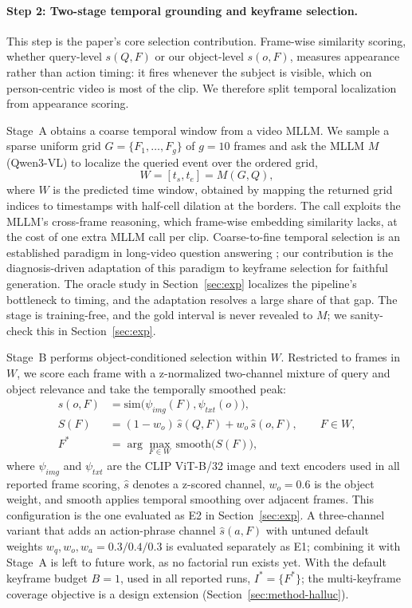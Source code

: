 \paragraph{Step 2: Two-stage temporal grounding and keyframe selection.} This step is the paper's core selection contribution. Frame-wise similarity scoring, whether query-level $s(Q,F)$ \citep{aks2502} or our object-level $s(o,F)$, measures appearance rather than action timing: it fires whenever the subject is visible, which on person-centric video is most of the clip. We therefore split temporal localization from appearance scoring.

Stage~A obtains a coarse temporal window from a video MLLM. We sample a sparse uniform grid $G = \{F_1, \ldots, F_g\}$ of $g = 10$ frames and ask the MLLM $M$ (Qwen3-VL) to localize the queried event over the ordered grid,
\begin{equation}
W = [t_s, t_e] = M(G, Q),
\end{equation}
where $W$ is the predicted time window, obtained by mapping the returned grid indices to timestamps with half-cell dilation at the borders. The call exploits the MLLM's cross-frame reasoning, which frame-wise embedding similarity lacks, at the cost of one extra MLLM call per clip. Coarse-to-fine temporal selection is an established paradigm in long-video question answering \citep{unitime2506,focus2510,himu2603,leadqa2507}; our contribution is the diagnosis-driven adaptation of this paradigm to keyframe selection for faithful generation. The oracle study in Section~\ref{sec:exp} localizes the pipeline's bottleneck to timing, and the adaptation resolves a large share of that gap. The stage is training-free, and the gold interval is never revealed to $M$; we sanity-check this in Section~\ref{sec:exp}.

Stage~B performs object-conditioned selection within $W$. Restricted to frames in $W$, we score each frame with a z-normalized two-channel mixture of query and object relevance and take the temporally smoothed peak:
\begin{align}
s(o, F) &= \mathrm{sim}\big(\psi_{img}(F), \psi_{txt}(o)\big), \\
S(F) &= (1-w_o)\,\hat{s}(Q,F) + w_o\,\hat{s}(o,F), \qquad F \in W, \\
F^* &= \arg\max_{F \in W}\, \mathrm{smooth}\big(S(F)\big),
\end{align}
where $\psi_{img}$ and $\psi_{txt}$ are the CLIP ViT-B/32 image and text encoders used in all reported frame scoring, $\hat{s}$ denotes a z-scored channel, $w_o = 0.6$ is the object weight, and $\mathrm{smooth}$ applies temporal smoothing over adjacent frames. This configuration is the one evaluated as E2 in Section~\ref{sec:exp}. A three-channel variant that adds an action-phrase channel $\hat{s}(a,F)$ with untuned default weights $w_q, w_o, w_a = 0.3/0.4/0.3$ is evaluated separately as E1; combining it with Stage~A is left to future work, as no factorial run exists yet. With the default keyframe budget $B = 1$, used in all reported runs, $I^* = \{F^*\}$; the multi-keyframe coverage objective is a design extension (Section~\ref{sec:method-halluc}).

